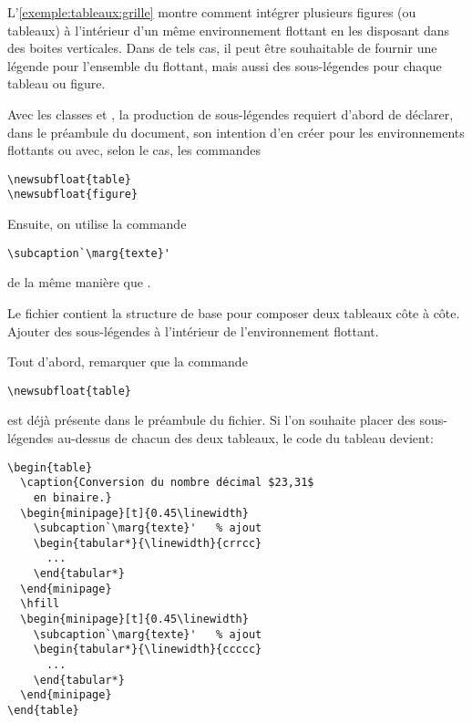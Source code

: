 \begin{exercice}
  \label{ex:tableaux:subcaptions}
  L'\autoref{exemple:tableaux:grille} montre comment intégrer
  plusieurs figures (ou tableaux) à l'intérieur d'un même
  environnement flottant en les disposant dans des boites verticales.
  Dans de tels cas, il peut être souhaitable de fournir une légende
  pour l'ensemble du flottant, mais aussi des sous-légendes pour
  chaque tableau ou figure.

  Avec les classes  et , la production de
  sous-légendes requiert d'abord de déclarer, dans le préambule du
  document, son intention d'en créer pour les environnements flottants
   ou  avec, selon le cas, les commandes
\begin{lstlisting}
\newsubfloat{table}
\newsubfloat{figure}
\end{lstlisting}
  Ensuite, on utilise la commande
\begin{lstlisting}
\subcaption`\marg{texte}'
\end{lstlisting}
  de la même manière que \cmd{\caption}.

  Le fichier  contient la structure
  de base pour composer deux tableaux côte à côte. Ajouter des
  sous-légendes à l'intérieur de l'environnement flottant.
  \begin{sol}
    Tout d'abord, remarquer que la commande
\begin{lstlisting}
\newsubfloat{table}
\end{lstlisting}
    est déjà présente dans le préambule du fichier. Si l'on souhaite
    placer des sous-légendes au-dessus de chacun des deux tableaux, le
    code du tableau devient:
\begin{lstlisting}
\begin{table}
  \caption{Conversion du nombre décimal $23,31$
    en binaire.}
  \begin{minipage}[t]{0.45\linewidth}
    \subcaption`\marg{texte}'   % ajout
    \begin{tabular*}{\linewidth}{crrcc}
      ...
    \end{tabular*}
  \end{minipage}
  \hfill
  \begin{minipage}[t]{0.45\linewidth}
    \subcaption`\marg{texte}'   % ajout
    \begin{tabular*}{\linewidth}{ccccc}
      ...
    \end{tabular*}
  \end{minipage}
\end{table}
\end{lstlisting}
  \end{sol}
\end{exercice}


